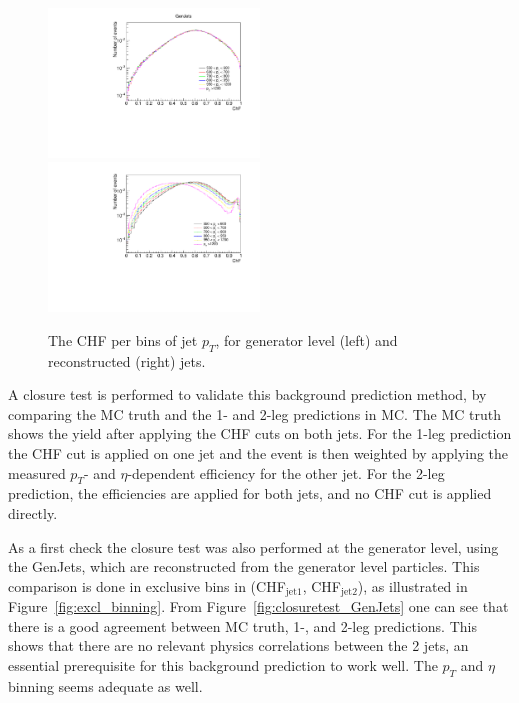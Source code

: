 \begin{figure}[ht]
  \centering
  \includegraphics[width=0.5\textwidth]{figures/ChFPerPtbin_GenJets.pdf}\hfill%
  \includegraphics[width=0.5\textwidth]{figures/ChFperPtbin.pdf}
  \caption{The CHF per bins of jet $p_T$, for generator level (left) and reconstructed (right) jets.}
  \label{fig:pt_dependence}
\end{figure}

A closure test is performed to validate this background prediction method, by comparing the MC truth and the 1- and 2-leg predictions in MC. The MC truth shows the yield after applying the CHF cuts on both jets. For the 1-leg prediction the CHF cut is applied on one jet and the event is then weighted by applying the measured $p_T$- and $\eta$-dependent efficiency for the other jet. For the 2-leg prediction, the efficiencies are applied for both jets, and no CHF cut is applied directly.

As a first check the closure test was also performed at the generator level, using the GenJets, which are reconstructed from the generator level particles. This comparison is done in exclusive bins in (CHF$_{\mathrm{jet 1}}$, CHF$_{\mathrm{jet 2}}$), as illustrated in Figure~\ref{fig:excl_binning}. From Figure~\ref{fig:closuretest_GenJets} one can see that there is a good agreement between MC truth, 1-, and 2-leg predictions. This shows that there are no relevant physics correlations between the 2 jets, an essential prerequisite for this background prediction to work well. The $p_T$ and $\eta$ binning seems adequate as well.

